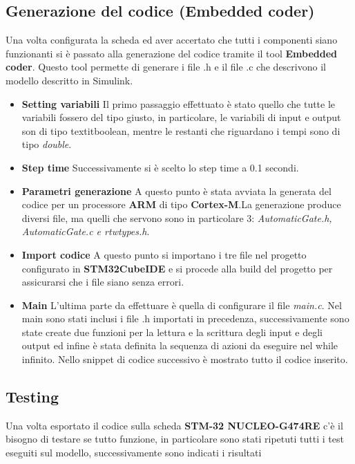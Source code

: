 \documentclass[12pt]{article}
\begin{document}
\subsection{Generazione del codice (Embedded coder)}

Una volta configurata la scheda ed aver accertato che tutti i componenti siano funzionanti si è passato alla generazione del codice tramite il tool \textbf{Embedded coder}. Questo tool permette di generare i file .h e il file .c che descrivono il modello descritto in Simulink.
\begin{itemize}
    \item {\textbf{Setting variabili}} Il primo passaggio effettuato è stato quello che tutte le variabili fossero del tipo giusto, in particolare, le variabili di input e output son di tipo textit{boolean}, mentre le restanti che riguardano i tempi sono di tipo \textit{double}.
    \item {\textbf{Step time}} Successivamente si è scelto lo step time a 0.1 secondi.
    \item {\textbf{Parametri generazione}} A questo punto è stata avviata la generata del codice per un processore \textbf{ARM} di tipo \textbf{Cortex-M}.La generazione produce diversi file, ma quelli che servono sono in particolare 3: \textit{AutomaticGate.h, AutomaticGate.c e rtwtypes.h}.
    \item {\textbf{Import codice}} A questo punto si importano i tre file nel progetto configurato in \textbf{STM32CubeIDE} e si procede alla build del progetto per assicurarsi che i file siano senza errori.
    \item {\textbf{Main}} L'ultima parte da effettuare è quella di configurare il file \textit{main.c}. Nel main sono stati inclusi i file .h importati in precedenza, successivamente sono state create due funzioni per la lettura e la scrittura degli input e degli output ed infine è stata definita la sequenza di azioni da eseguire nel while infinito. Nello snippet di codice successivo è mostrato tutto il codice inserito.
\end{itemize} 

\subsection{Testing}
Una volta esportato il codice sulla scheda \textbf{STM-32 NUCLEO-G474RE} c'è il bisogno di testare se tutto funzione, in particolare sono stati ripetuti tutti i test eseguiti sul modello, successivamente sono indicati i risultati
\end{document}
